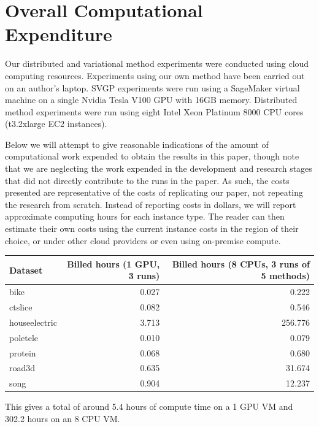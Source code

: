 \section{Overall Computational Expenditure}
Our distributed and variational method experiments were conducted using cloud computing resources. Experiments using our own method have been carried out on an author's laptop. 
SVGP experiments were run using a SageMaker virtual machine on a single Nvidia Tesla V100 GPU with 16GB memory. Distributed method experiments were run using eight Intel Xeon Platinum 8000 CPU cores (t3.2xlarge EC2 instances).

\medskip
Below we will attempt to give reasonable indications of the amount of computational work expended to obtain the results in this paper, though note that we are neglecting the work expended in the development and research stages that did not directly contribute to the runs in the paper.
As such, the costs presented are representative of the costs of replicating our paper, not repeating the research from scratch.
Instead of reporting costs in dollars, we will report approximate computing hours for each instance type.
The reader can then estimate their own costs using the current instance costs in the region of their choice, or under other cloud providers or even using on-premise compute.

\begin{table}[h]
\centering
\begin{tabular}{lrr}
    \toprule
    \textbf{Dataset}       &  \textbf{Billed hours (1 GPU, 3 runs)} & \textbf{Billed hours (8 CPUs, 3 runs of 5 methods)}  \\
    \midrule
    bike          &      0.027 & 0.222\\
    ctslice       &      0.082 & 0.546\\
    houseelectric &      3.713 & 256.776\\
    poletele      &      0.010 & 0.079\\
    protein       &      0.068 & 0.680\\
    road3d        &      0.635 & 31.674\\
    song          &      0.904 & 12.237\\
    \bottomrule
    \end{tabular}
    \end{table}

This gives a total of around 5.4 hours of compute time on a 1 GPU VM and 302.2 hours on an 8 CPU VM.
\clearpage

